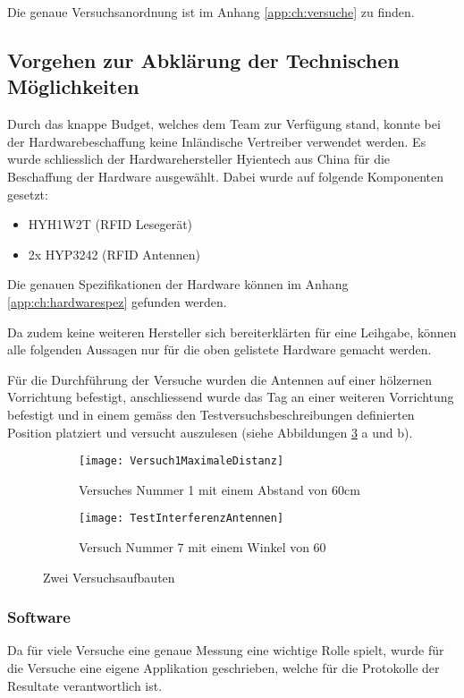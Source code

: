 Die genaue Versuchsanordnung ist im Anhang \ref{app:ch:versuche} zu finden.

\subsection{Vorgehen zur Abklärung der Technischen Möglichkeiten}

Durch das knappe Budget, welches dem Team zur Verfügung stand, konnte bei der Hardwarebeschaffung keine Inländische Vertreiber verwendet werden. Es wurde schliesslich der Hardwarehersteller Hyientech aus China für die Beschaffung der Hardware ausgewählt. Dabei wurde auf folgende Komponenten gesetzt:

\begin{itemize}
	\item HYH1W2T (RFID Lesegerät)
	\item 2x HYP3242 (RFID Antennen)
\end{itemize}

Die genauen Spezifikationen der Hardware können im Anhang \ref{app:ch:hardwarespez} gefunden werden.

Da zudem keine weiteren Hersteller sich bereiterklärten für eine Leihgabe, können alle folgenden Aussagen nur für die oben gelistete Hardware gemacht werden.

Für die Durchführung der Versuche wurden die Antennen auf einer hölzernen Vorrichtung befestigt, anschliessend wurde das Tag an einer weiteren Vorrichtung befestigt und in einem gemäss den Testversuchsbeschreibungen definierten Position platziert und versucht auszulesen (siehe Abbildungen \ref{fig:versuchsaufbauten} a und b).

\begin{figure}[htb]
	\begin{subfigure}{.5\linewidth}
		\texttt{[image: Versuch1MaximaleDistanz]}
		\caption{Versuches Nummer 1 mit einem Abstand von 60cm}
		\label{fig:versuchaufbaunmr1}
	\end{subfigure}\hfill%
	\begin{subfigure}{.35\linewidth}
		\centering
		\texttt{[image: TestInterferenzAntennen]}
		\caption{Versuch Nummer 7 mit einem Winkel von 60\SIUnitSymbolDegree}
		\label{fig:versuchaufbaunmr7}
	\end{subfigure}
	\caption{Zwei Versuchsaufbauten}
	\label{fig:versuchsaufbauten}
\end{figure}


\subsubsection{Software}
Da für viele Versuche eine genaue Messung eine wichtige Rolle spielt, wurde für die Versuche eine eigene Applikation geschrieben, welche für die Protokolle der Resultate verantwortlich ist.

